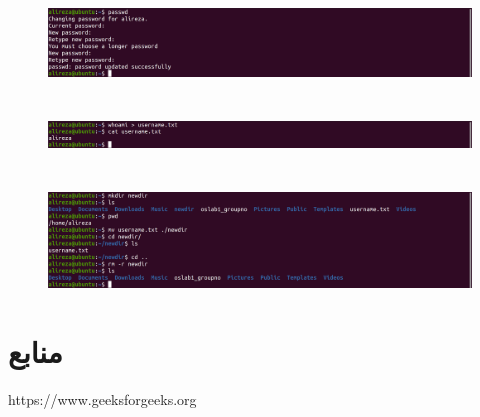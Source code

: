 \documentclass{article}
\begin{document}
\section{}
\begin{figure}[ht]
    \centering
    \includegraphics[width=1.0\textwidth]{figures/6.png}
    \caption{}
    \label{fig:fig1}
\end{figure}
\FloatBarrier

\section{}
\begin{figure}[ht]
    \centering
    \includegraphics[width=1.0\textwidth]{figures/7.png}
    \caption{}
    \label{fig:fig1}
\end{figure}
\FloatBarrier

\section{}
\begin{figure}[ht]
    \centering
    \includegraphics[width=1.0\textwidth]{figures/8.png}
    \caption{}
    \label{fig:fig1}
\end{figure}
\FloatBarrier

\section*{منابع}
\renewcommand{\section}[2]{}%
\begin{thebibliography}{99} %


\begin{LTRitems}

\resetlatinfont

 https://www.geeksforgeeks.org
\end{LTRitems}

\end{thebibliography}
\end{document}

